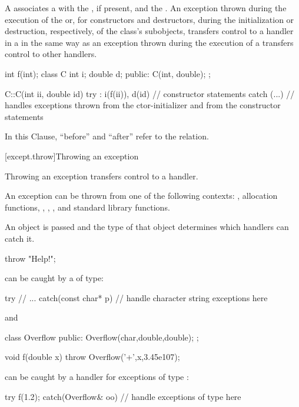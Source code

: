 \pnum
{}%
%
A
associates a
with the
,
if present, and the
.
An exception
thrown during the execution of the
or, for constructors and destructors, during the initialization or
destruction, respectively, of the class's subobjects,
transfers control to a handler in a
in the same way as an exception thrown during the execution of a
transfers control to other handlers.
\begin{example}
\begin{codeblock}
int f(int);
class C {
  int i;
  double d;
public:
  C(int, double);
};

C::C(int ii, double id)
try : i(f(ii)), d(id) {
    // constructor statements
} catch (...) {
    // handles exceptions thrown from the ctor-initializer and from the constructor statements
}
\end{codeblock}
\end{example}

\pnum
In this Clause, ``before'' and ``after'' refer to the
 relation.

[except.throw]{Throwing an exception}%
%

\pnum
Throwing an exception transfers control to a handler.
\begin{note}
An exception can be thrown from one of the following contexts:
,
allocation functions,
,
,
, and standard library
functions.
\end{note}
An object is passed and the type of that object determines which handlers
can catch it.
\begin{example}
\begin{codeblock}
throw "Help!";
\end{codeblock}
can be caught by a
of
type:
\begin{codeblock}
try {
    // ...
} catch(const char* p) {
    // handle character string exceptions here
}
\end{codeblock}
and
\begin{codeblock}
class Overflow {
public:
    Overflow(char,double,double);
};

void f(double x) {
    throw Overflow('+',x,3.45e107);
}
\end{codeblock}
can be caught by a handler for exceptions of type
:
\begin{codeblock}
try {
    f(1.2);
} catch(Overflow& oo) {
    // handle exceptions of type  here
}
\end{codeblock}
\end{example}

